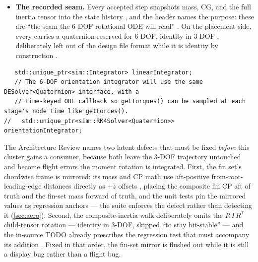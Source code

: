 \begin{itemize}
  quaternions, with a time-keyed callback so torques are sampled at each stage's node time
  exactly as forces are. The solver templates admit the quaternion instantiation by
  \cppinline|static_assert| , though only 
  instantiations exist , and the stage arithmetic would not
  compile for  without adaptation --- the template is a staged
  intention, not working rotational machinery.
\item \textbf{The recorded seam.} Every accepted step snapshots mass, CG, and the full
  inertia tensor into the state history , and the header names
  the purpose: these are ``the seam the 6-DOF rotational ODE will read''
  . On the placement side, every  carries a
   quaternion reserved for 6-DOF, identity in 3-DOF
  , deliberately left out of the design file format while
  it is identity by construction .
\end{itemize}

\begin{listing}[htbp]
\begin{verbatim}
   std::unique_ptr<sim::Integrator> linearIntegrator;
   // The 6-DOF orientation integrator will use the same DESolver<Quaternion> interface, with a
   // time-keyed ODE callback so getTorques() can be sampled at each stage's node time like getForces().
//   std::unique_ptr<sim::RK4Solver<Quaternion>> orientationIntegrator;
\end{verbatim}
\caption{The rotational half of the propagator, present as a commented-out member with its
design already stated in place . The dormant seam names its
own consumer: a quaternion ODE fed by \texttt{getTorques()} at stage node times.}
\label{lst:incomplete-orientation}
\end{listing}

\begin{keyinsight}
The Architecture Review names two latent defects that must be fixed \emph{before} this
cluster gains a consumer, because both leave the 3-DOF trajectory untouched and become
flight errors the moment rotation is integrated. First, the fin set's chordwise frame is mirrored: its mass
and CP math use aft-positive from-root-leading-edge distances directly as $+z$ offsets
, placing the composite fin CP aft of truth and the fin-set
mass forward of truth, and the unit tests pin the mirrored values as regression anchors
 --- the suite enforces the defect rather than
detecting it (\cref{sec:aero}). Second, the composite-inertia walk deliberately omits the
$R\,I\,R^{\mathsf{T}}$ child-tensor rotation --- identity in 3-DOF, skipped ``to stay
bit-stable'' --- and the in-source TODO already prescribes the regression test that must
accompany its addition . Fixed in that order, the fin-set
mirror is flushed out while it is still a display bug rather than a flight bug.
\end{keyinsight}


